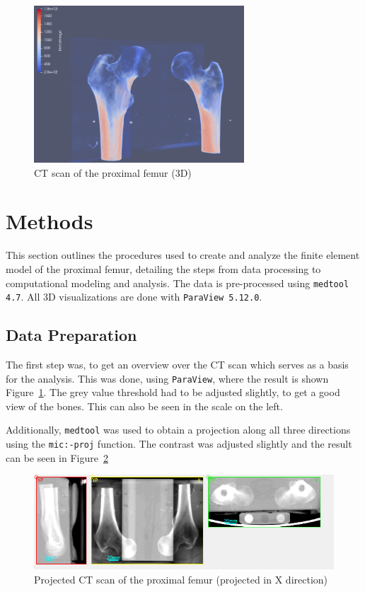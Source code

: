 \documentclass[a4paper,12pt]{article}
\begin{document}
    \begin{figure}[htbp]
        \centering
        \includegraphics[width=0.7\textwidth]{data}
        \caption{CT scan of the proximal femur (3D)}
        \label{fig:data}
    \end{figure}


    \section{Methods}
    This section outlines the procedures used to create and analyze the finite element model of the proximal femur, detailing the steps from data processing to computational modeling and analysis.
    The data is pre-processed using \texttt{medtool 4.7}.
    All 3D visualizations are done with \texttt{ParaView 5.12.0}.

    \subsection{Data Preparation}\label{subsec:data-preparation}
    The first step was, to get an overview over the CT scan which serves as a basis for the analysis.
    This was done, using \texttt{ParaView}, where the result is shown Figure~\ref{fig:data}.
    The grey value threshold had to be adjusted slightly, to get a good view of the bones.
    This can also be seen in the scale on the left.

    \vspace{10pt}
    Additionally, \texttt{medtool} was used to obtain a projection along all three directions using the \texttt{mic:-proj} function.
    The contrast was adjusted slightly and the result can be seen in Figure~\ref{fig:projected}

    \begin{figure}[htbp]
        \centering
        \includegraphics[width=\textwidth]{projected}
        \caption{Projected CT scan of the proximal femur (projected in X direction)}
        \label{fig:projected}
    \end{figure}
\end{document}
